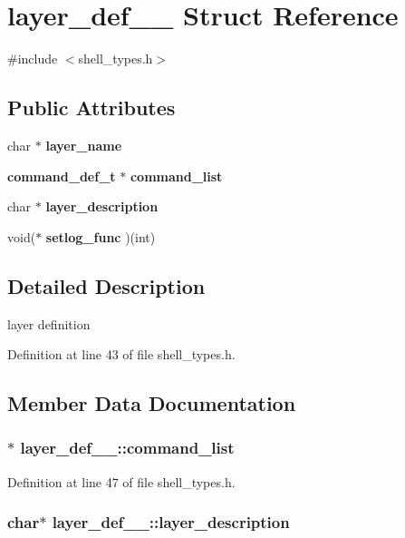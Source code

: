 \section{layer\_\-def\_\-\_\- Struct Reference}
\label{structlayer__def____}


{\ttfamily \#include $<$shell\_\-types.h$>$}\subsection*{Public Attributes}
\begin{DoxyCompactItemize}
\item 
char $\ast$ {\bf layer\_\-name}
\item 
{\bf command\_\-def\_\-t} $\ast$ {\bf command\_\-list}
\item 
char $\ast$ {\bf layer\_\-description}
\item 
void($\ast$ {\bf setlog\_\-func} )(int)
\end{DoxyCompactItemize}


\subsection{Detailed Description}
layer definition 

Definition at line 43 of file shell\_\-types.h.

\subsection{Member Data Documentation}
\subsubsection[{command\_\-list}]{$\ast$ {\bf layer\_\-def\_\-\_\-::command\_\-list}}\label{structlayer__def_____afd47e95d6f7af78b82d58856a08d5838}


Definition at line 47 of file shell\_\-types.h.
\subsubsection[{layer\_\-description}]{\setlength{\rightskip}{0pt plus 5cm}char$\ast$ {\bf layer\_\-def\_\-\_\-::layer\_\-description}}\label{structlayer__def_____afe53dd726108b2daf0a682db98ff2552}


